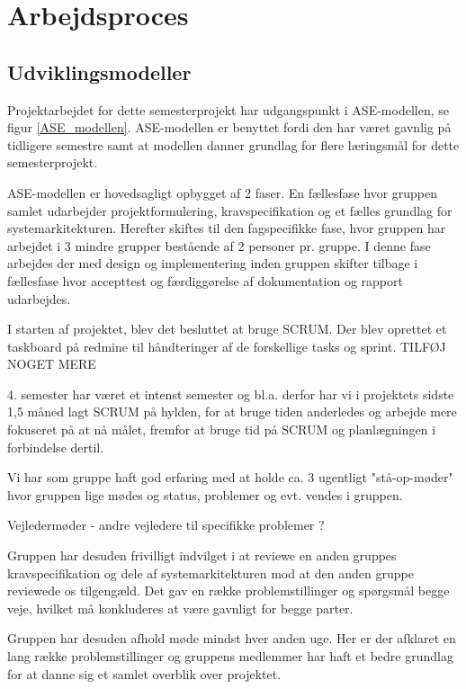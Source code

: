 
\chapter{Arbejdsproces}

\section{Udviklingsmodeller}

Projektarbejdet for dette semesterprojekt har udgangspunkt i ASE-modellen, se figur \ref{ASE_modellen}. ASE-modellen er benyttet fordi den har været gavnlig på tidligere semestre samt at modellen danner grundlag for flere læringsmål for dette semesterprojekt.

ASE-modellen er hovedsagligt opbygget af 2 faser. En fællesfase hvor gruppen samlet udarbejder projektformulering, kravspecifikation og et fælles grundlag for systemarkitekturen. Herefter skiftes til den fagspecifikke fase, hvor gruppen har arbejdet i 3 mindre grupper bestående af 2 personer pr. gruppe. I denne fase arbejdes der med design og implementering inden gruppen skifter tilbage i fællesfase hvor accepttest og færdiggørelse af dokumentation og rapport udarbejdes. 


I starten af projektet, blev det besluttet at bruge SCRUM. Der blev oprettet et taskboard på redmine til håndteringer af de forskellige tasks og sprint. TILFØJ NOGET MERE

4. semester har været et intenst semester og bl.a. derfor har vi i projektets sidste 1,5 måned lagt SCRUM på hylden, for at bruge tiden anderledes og arbejde mere fokuseret på at nå målet, fremfor at bruge tid på SCRUM og planlægningen i forbindelse dertil. 

Vi har som gruppe haft god erfaring med at holde ca. 3 ugentligt "stå-op-møder" hvor gruppen lige mødes og status, problemer og evt. vendes i gruppen. 

Vejledermøder - andre vejledere til specifikke problemer ?

Gruppen har desuden frivilligt indvilget i at reviewe en anden gruppes kravspecifikation og dele af systemarkitekturen mod at den anden gruppe reviewede os tilgengæld. Det gav en række problemstillinger og spørgsmål begge veje, hvilket må konkluderes at være gavnligt for begge parter.

Gruppen har desuden afhold møde mindst hver anden uge. Her er der afklaret en lang række problemstillinger og gruppens medlemmer har haft et bedre grundlag for at danne sig et samlet overblik over projektet. 


